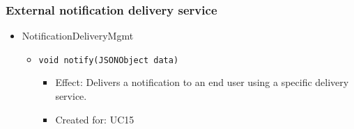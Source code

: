     \subsubsection{External notification delivery service}
        \begin{itemize}
            \item NotificationDeliveryMgmt
            \begin{itemize}
                \item \texttt{void notify(JSONObject data)}
                \begin{itemize}
                    \item Effect: Delivers a notification to an end user using a specific delivery service.
                    \item Created for: UC15
                \end{itemize}
            \end{itemize}
        \end{itemize}

